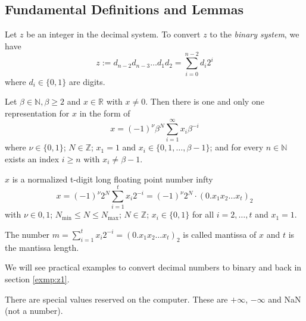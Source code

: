 \subsection{Fundamental Definitions and Lemmas}
\begin{definition}
    Let \(z\) be an integer in the decimal system. To convert \(z\) to the \textit{binary system}, we have
    \begin{equation*}
        z := d_{n-2}d_{n-3}\dots d_1 d_2 = \sum_{i = 0}^{n-2}d_i 2^i
    \end{equation*}
    where \(d_i \in \{0, 1\}\) are digits. \cite{bib:rabus}
\end{definition}
%
\begin{lemma} \label{theo:bina}
    Let \(\beta \in \mathbb{N}, \beta \geq 2\) and \(x \in \mathbb{R}\) with \(x \neq 0\). Then there is one and only one representation for \(x\) in the form of
    \begin{equation*}
        x = (-1)^{\nu} \beta^N \sum_{i = 1}^{\infty}x_i \beta^{-i}
    \end{equation*}
    where \(\nu \in \{0, 1\}\); \(N \in \mathbb{Z}\); \(x_1 = 1\) and \(x_i \in \{0, 1, \dots , \beta - 1\}\); and for every \(n \in \mathbb{N}\) exists an index \(i \geq n\) with \(x_i \neq \beta - 1\). \cite{bib:rabus}
\end{lemma}
%
\begin{definition}
    \(x\) is a normalized t-digit long floating point number infty
    \begin{equation*}
        x = (-1)^{\nu} 2^N \sum_{i = 1}^{t}x_i 2^{-i} = (-1)^{\nu} 2^N \cdot (0.x_1 x_2 \dots x_t)_2
    \end{equation*}
    with \(\nu \in {0, 1}\); \(N_{\text{min}} \leq N \leq N_{\text{max}}\); \(N \in \mathbb{Z}\); \(x_i \in \{0, 1\}\) for all \(i = 2, \dots, t\) and \(x_1 = 1\).

    The number \(m = \sum_{i = 1}^{t}x_i 2^{-i} = (0.x_1 x_2 \dots x_t)_2\) is called mantissa of \(x\) and \(t\) is the mantissa length.  \cite{bib:rabus}
\end{definition}
We will see practical examples to convert decimal numbers to binary and back in section \ref{exmp:z1}.
\begin{remark}
There are special values reserved on the computer. These are \(+\infty\), \(-\infty\) and NaN (not a number).  \cite{bib:rabus}
\end{remark}
%
